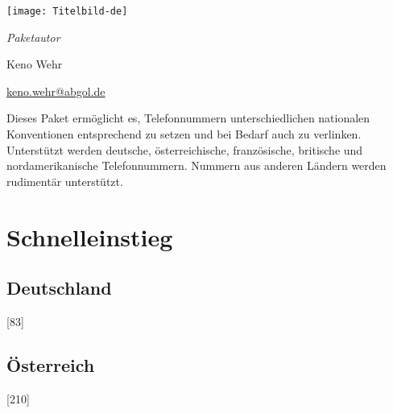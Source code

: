 \documentclass[numbers=noenddot]{scrreprt}
\begin{document}
\begin{titlepage}
\begin{center}
\texttt{[image: Titelbild-de]}

\vfill
\Large
\textit{Paketautor}

\medskip
Keno Wehr

\large
\smallskip
\url{keno.wehr@abgol.de}
\end{center}

\vfill
\noindent Dieses Paket ermöglicht es, Telefonnummern unterschiedlichen nationalen Konventionen entsprechend zu setzen und bei Bedarf auch zu verlinken. Unterstützt werden deutsche, österreichische, französische, britische und nordamerikanische Telefonnummern. Nummern aus anderen Ländern werden rudimentär unterstützt.
\end{titlepage}

\tableofcontents


\chapter{Schnelleinstieg}
\section{Deutschland}
\begin{sidebyside}
  [83]
\end{sidebyside}
\begin{sidebyside}
\end{sidebyside}
\begin{sidebyside}
\end{sidebyside}
\begin{sidebyside}
\end{sidebyside}

\section{Österreich}
\begin{sidebyside}
  [210]
\end{sidebyside}

\begin{sidebyside}
\end{sidebyside}
\end{document}
